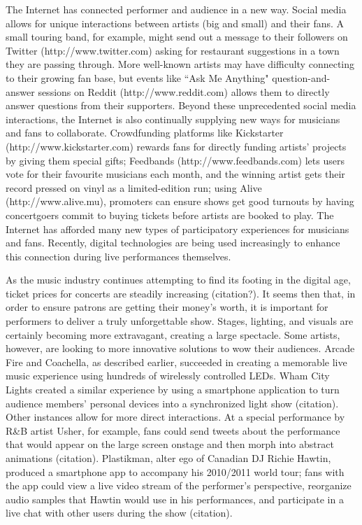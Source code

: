 The Internet has connected performer and audience in a new way. Social media allows for unique interactions between artists (big and small) and their fans. A small touring band, for example, might send out a message to their followers on Twitter (http://www.twitter.com) asking for restaurant suggestions in a town they are passing through. More well-known artists may have difficulty connecting to their growing fan base, but events like ``Ask Me Anything" question-and-answer sessions on Reddit (http://www.reddit.com) allows them to directly answer questions from their supporters. Beyond these unprecedented social media interactions, the Internet is also continually supplying new ways for musicians and fans to collaborate. Crowdfunding platforms like Kickstarter (http://www.kickstarter.com) rewards fans for directly funding artists' projects by giving them special gifts; Feedbands (http://www.feedbands.com) lets users vote for their favourite musicians each month, and the winning artist gets their record pressed on vinyl as a limited-edition run; using Alive (http://www.alive.mu), promoters can ensure shows get good turnouts by having concertgoers commit to buying tickets before artists are booked to play. The Internet has afforded many new types of participatory experiences for musicians and fans. Recently, digital technologies are being used increasingly to enhance this connection during live performances themselves.

As the music industry continues attempting to find its footing in the digital age, ticket prices for concerts are steadily increasing (citation?). It seems then that, in order to ensure patrons are getting their money's worth, it is important for performers to deliver a truly unforgettable show. Stages, lighting, and visuals are certainly becoming more extravagant, creating a large spectacle. Some artists, however, are looking to more innovative solutions to wow their audiences. Arcade Fire and Coachella, as described earlier, succeeded in creating a memorable live music experience using hundreds of wirelessly controlled LEDs. Wham City Lights created a similar experience by using a smartphone application to turn audience members' personal devices into a synchronized light show (citation). Other instances allow for more direct interactions. At a special performance by R\&B artist Usher, for example, fans could send tweets about the performance that would appear on the large screen onstage and then morph into abstract animations (citation). Plastikman, alter ego of Canadian DJ Richie Hawtin, produced a smartphone app to accompany his 2010/2011 world tour; fans with the app could view a live video stream of the performer's perspective, reorganize audio samples that Hawtin would use in his performances, and participate in a live chat with other users during the show (citation).


